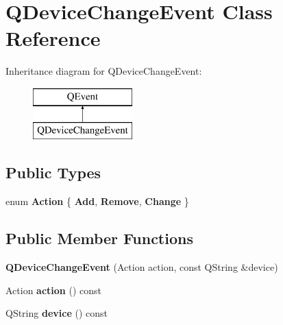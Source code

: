 \hypertarget{class_q_device_change_event}{}\section{Q\+Device\+Change\+Event Class Reference}
\label{class_q_device_change_event}
Inheritance diagram for Q\+Device\+Change\+Event\+:\begin{figure}[H]
\begin{center}
\leavevmode
\includegraphics[height=2.000000cm]{class_q_device_change_event}
\end{center}
\end{figure}
\subsection*{Public Types}
\begin{DoxyCompactItemize}
\item 
\mbox{\label{class_q_device_change_event_a95395bb9d467c7fc5667c8502c65a3b9}} 
enum {\bfseries Action} \{ {\bfseries Add}, 
{\bfseries Remove}, 
{\bfseries Change}
 \}
\end{DoxyCompactItemize}
\subsection*{Public Member Functions}
\begin{DoxyCompactItemize}
\item 
\mbox{\label{class_q_device_change_event_a44937281ebfbce3e2730744bdc087234}} 
{\bfseries Q\+Device\+Change\+Event} (Action action, const Q\+String \&device)
\item 
\mbox{\label{class_q_device_change_event_a94f70179a81bcb65ffb1ef6a33523d06}} 
Action {\bfseries action} () const
\item 
\mbox{\label{class_q_device_change_event_ab1dffdecc070680ba7f3eb98fb836e4e}} 
Q\+String {\bfseries device} () const
\end{DoxyCompactItemize}
